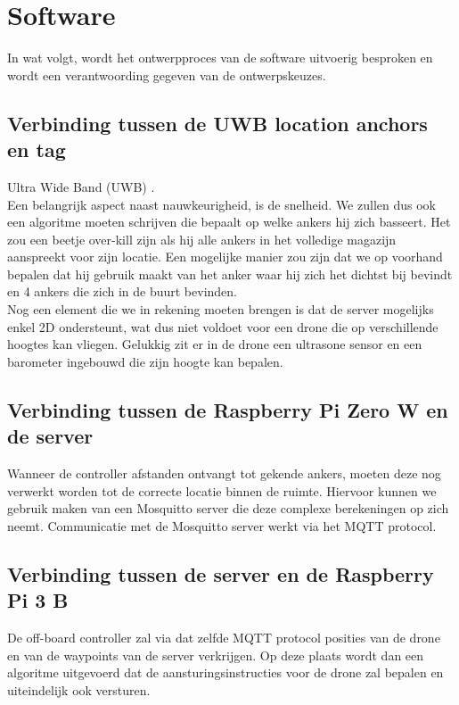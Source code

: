 \chapter{Software}
In wat volgt, wordt het ontwerpproces van de software uitvoerig besproken en wordt een verantwoording gegeven van de ontwerpskeuzes.

\section{Verbinding tussen de UWB location anchors en tag} \label{sec:uwb_tag}
Ultra Wide Band (UWB) \cite{uwb2016}.\\

Een belangrijk aspect naast nauwkeurigheid, is de snelheid.
We zullen dus ook een algoritme moeten schrijven die bepaalt op welke ankers hij zich basseert.
Het zou een beetje over-kill zijn als hij alle ankers in het volledige magazijn aanspreekt voor zijn locatie.
Een mogelijke manier zou zijn dat we op voorhand bepalen dat hij gebruik maakt van het anker waar hij zich het dichtst bij bevindt en 4 ankers die zich in de buurt bevinden.\\

Nog een element die we in rekening moeten brengen is dat de server mogelijks enkel 2D ondersteunt, wat dus niet voldoet voor een drone die op verschillende hoogtes kan vliegen.
Gelukkig zit er in de drone een ultrasone sensor en een barometer ingebouwd die zijn hoogte kan bepalen.

\section{Verbinding tussen de Raspberry Pi Zero W en de server} \label{sec:raspberry_server}
Wanneer de controller afstanden ontvangt tot gekende ankers, moeten deze nog verwerkt worden tot de correcte locatie binnen de ruimte.
Hiervoor kunnen we gebruik maken van een Mosquitto server die deze complexe berekeningen op zich neemt.
Communicatie met de Mosquitto server werkt via het MQTT protocol.\\

\section{Verbinding tussen de server en de Raspberry Pi 3 B} \label{sec:server_raspberry}
De off-board controller zal via dat zelfde MQTT protocol posities van de drone en van de waypoints van de server verkrijgen.
Op deze plaats wordt dan een algoritme uitgevoerd dat de aansturingsinstructies voor de drone zal bepalen en uiteindelijk ook versturen.\\

